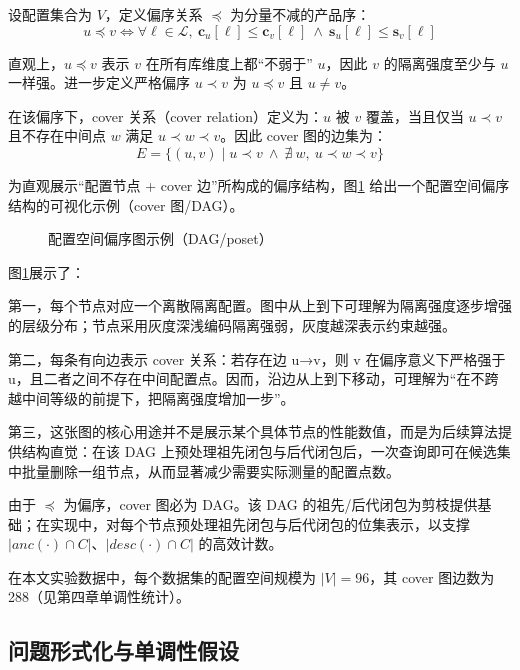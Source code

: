 \documentclass[UTF8,a4paper,12pt,twoside]{ctexart}  %
\begin{document}
设配置集合为 \(V\)，定义偏序关系 \(\preceq\) 为分量不减的产品序：
\begin{equation}
  u \preceq v \iff \forall \ell\in\mathcal{L},\ \mathbf{c}_u[\ell] \le \mathbf{c}_v[\ell]\ \wedge\ \mathbf{s}_u[\ell] \le \mathbf{s}_v[\ell]
\end{equation}

直观上，\(u\preceq v\) 表示 \(v\) 在所有库维度上都``不弱于'' \(u\)，因此
\(v\) 的隔离强度至少与 \(u\) 一样强。进一步定义严格偏序 \(u\prec v\) 为
\(u\preceq v\) 且 \(u\ne v\)。

在该偏序下，cover 关系（cover relation）定义为：\(u\) 被 \(v\)
覆盖，当且仅当 \(u\prec v\) 且不存在中间点 \(w\) 满足
\(u\prec w\prec v\)。因此 cover 图的边集为：
\begin{equation}
  E = \{(u, v) \mid u \prec v \ \wedge\ \nexists\ w,\ u \prec w \prec v\}
\end{equation}

为直观展示``配置节点 + cover 边''所构成的偏序结构，图\ref{fig:fig08_plot}
给出一个配置空间偏序结构的可视化示例（cover 图/DAG）。
\begin{figure}[h]
  \centering
  
  \caption{配置空间偏序图示例（DAG/poset）}
  \label{fig:fig08_plot}
\end{figure}

图\ref{fig:fig08_plot}展示了：

第一，每个节点对应一个离散隔离配置。图中从上到下可理解为隔离强度逐步增强的层级分布；节点采用灰度深浅编码隔离强弱，灰度越深表示约束越强。

第二，每条有向边表示 cover 关系：若存在边 u→v，则 v 在偏序意义下严格强于
u，且二者之间不存在中间配置点。因而，沿边从上到下移动，可理解为``在不跨越中间等级的前提下，把隔离强度增加一步''。

第三，这张图的核心用途并不是展示某个具体节点的性能数值，而是为后续算法提供结构直觉：在该
DAG
上预处理祖先闭包与后代闭包后，一次查询即可在候选集中批量删除一组节点，从而显著减少需要实际测量的配置点数。

由于 \(\preceq\) 为偏序，cover 图必为 DAG。该 DAG
的祖先/后代闭包为剪枝提供基础；在实现中，对每个节点预处理祖先闭包与后代闭包的位集表示，以支撑
\(|anc(\cdot)\cap C|\)、\(|desc(\cdot)\cap C|\) 的高效计数。

在本文实验数据中，每个数据集的配置空间规模为 \(|V|=96\)，其 cover
图边数为 288（见第四章单调性统计）。

\subsection{问题形式化与单调性假设}
\end{document}
